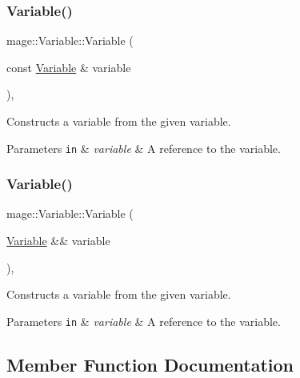 \subsubsection{\texorpdfstring{Variable()}{Variable()}\hspace{0.1cm}{\footnotesize\ttfamily [2/3]}}
{\footnotesize\ttfamily mage\+::\+Variable\+::\+Variable (\begin{DoxyParamCaption}\item[{const \hyperlink{structmage_1_1_variable}{Variable} \&}]{variable }\end{DoxyParamCaption})\hspace{0.3cm}{\ttfamily [private]}, {\ttfamily [delete]}}

Constructs a variable from the given variable.


\begin{DoxyParams}[1]{Parameters}
\mbox{\tt in}  & {\em variable} & A reference to the variable. \\
\hline
\end{DoxyParams}
\hypertarget{structmage_1_1_variable_afe6a57008273cc663ad62f31df824a97}{}\label{structmage_1_1_variable_afe6a57008273cc663ad62f31df824a97} 
\subsubsection{\texorpdfstring{Variable()}{Variable()}\hspace{0.1cm}{\footnotesize\ttfamily [3/3]}}
{\footnotesize\ttfamily mage\+::\+Variable\+::\+Variable (\begin{DoxyParamCaption}\item[{\hyperlink{structmage_1_1_variable}{Variable} \&\&}]{variable }\end{DoxyParamCaption})\hspace{0.3cm}{\ttfamily [private]}, {\ttfamily [delete]}}

Constructs a variable from the given variable.


\begin{DoxyParams}[1]{Parameters}
\mbox{\tt in}  & {\em variable} & A reference to the variable. \\
\hline
\end{DoxyParams}


\subsection{Member Function Documentation}
\hypertarget{structmage_1_1_variable_a7f70fdadf34cdf6b26adc9910eade11d}{}\label{structmage_1_1_variable_a7f70fdadf34cdf6b26adc9910eade11d} 
